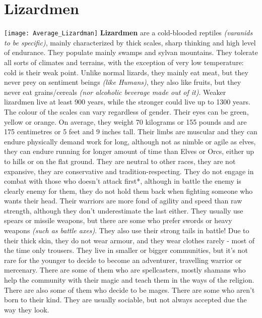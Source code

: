 \documentclass[openany,10pt,a4paper]{book}
\begin{document}
\section{Lizardmen}
\texttt{[image: Average\_Lizardman]}\newline
\textbf{Lizardmen} are a cold-blooded reptiles \textit{(varanids to be specific)}, mainly characterized by thick scales, sharp thinking and high level of endurance. They populate mainly swamps and sylvan mountains. They tolerate all sorts of climates and terrains, with the exception of very low temperature: cold is their weak point. Unlike normal lizards, they mainly eat meat, but they never prey on sentiment beings \textit{(like Humans)}, they also like fruits, but they never eat grains/cereals \textit{(nor alcoholic beverage made out of it)}. Weaker lizardmen live at least 900 years, while the stronger could live up to 1300 years. The colour of the scales can vary regardless of gender. Their eyes can be green, yellow or orange. On average, they weight 70 kilograms or 155 pounds and are 175 centimetres or 5 feet and 9 inches tall.\newline
Their limbs are muscular and they can endure physically demand work for long, although not as nimble or agile as elves, they can endure running for longer amount of time than Elves or Orcs, either up to hills or on the flat ground. They are neutral to other races, they are not expansive, they are conservative and tradition-respecting. They do not engage in combat with those who doesn't attack first*, although in battle the enemy is clearly enemy for them, they do not hold them back when fighting someone who wants their head. Their warriors are more fond of agility and speed than raw strength, although they don’t underestimate the last either. They usually use spears or missile weapons, but there are some who prefer swords or heavy weapons \textit{(such as battle axes)}. They also use their strong tails in battle! Due to their thick skin, they do not wear armour, and they wear clothes rarely - most of the time only trousers.\newline
They live in smaller or bigger communities, but it’s not rare for the younger to decide to become an adventurer, travelling warrior or mercenary. There are some of them who are spellcasters, mostly shamans who help the community with their magic and teach them in the ways of the religion. There are also some of them who decide to be mages. There are some who aren’t born to their kind. They are usually sociable, but not always accepted due the way they look.\newline
\end{document}
